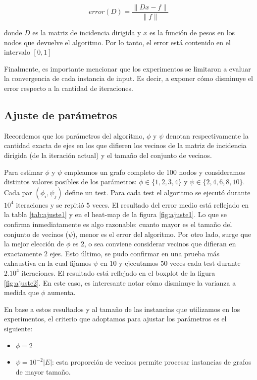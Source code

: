 \documentclass[conference,compsoc,a4paper]{IEEEtran}
\begin{document}
$$error(D) = \frac{\|Dx-f\|}{\|f\|}$$

\noindent donde $D$ es la matriz de incidencia dirigida y $x$ es la función de 
pesos en los nodos que devuelve el algoritmo. Por lo tanto, el error 
está contenido en el intervalo $[0,1]$

\smallskip

Finalmente, es importante mencionar que los experimentos se limitaron a 
evaluar la convergencia de cada instancia de input. Es decir, a exponer 
cómo disminuye el error respecto a la cantidad de iteraciones.

\subsection{Ajuste de parámetros}

Recordemos que los parámetros del algoritmo, $\phi$ y $\psi$ denotan 
respectivamente la cantidad exacta de ejes en los que difieren los 
vecinos de la matriz de incidencia dirigida (de la iteración actual) y 
el tamaño del conjunto de vecinos.

\smallskip

Para estimar $\phi$ y $\psi$ empleamos un grafo completo de 100 
nodos y consideramos distintos valores posibles de los parámetros: 
$\phi \in \{1,2,3,4\}$ y $\psi \in \{2,4,6,8,10\}$. Cada par 
$(\phi_i, \psi_j)$ define un test. Para cada test el algoritmo se 
ejecutó durante $10^4$ iteraciones y se repitió $5$ veces. El resultado 
del error medio está reflejado en la tabla \ref{tab:ajuste1} y en el 
heat-map de la figura \ref{fig:ajuste1}. Lo que se confirma 
inmediatamente es algo razonable: cuanto mayor es el tamaño del 
conjunto de vecinos ($\psi$), menor es el error del algoritmo. Por 
otro lado, surge que la mejor elección de $\phi$ es $2$, o sea 
conviene considerar vecinos que difieran en exactamente $2$ ejes. Esto 
último, se pudo confirmar en una prueba más exhaustiva en la cual 
fijamos $\psi$ en $10$ y ejecutamos $50$ veces cada test durante 
$2 . 10^4$ iteraciones. El resultado está reflejado en el boxplot de la 
figura \ref{fig:ajuste2}. En este caso, es interesante notar cómo 
disminuye la varianza a medida que $\phi$ aumenta.

\smallskip

En base a estos resultados y al tamaño de las instancias que utilizamos 
en los experimentos, el criterio que adoptamos para ajustar los 
parámetros es el siguiente:

\begin{itemize}
	\item $\phi = 2$
	\item $\psi = 10^{-2} |E|$: esta proporción de vecinos permite 
	procesar instancias de grafos de mayor tamaño.
\end{itemize}
\end{document}
